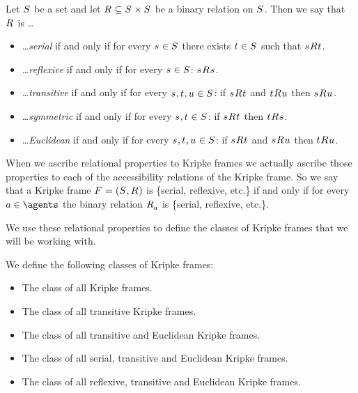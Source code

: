 \pagebreak

\begin{definition}
Let $\kStates$ be a set and let $\kAccessibilityRel \subseteq \kStates \times \kStates$ be a binary relation on $\kStates$. 
Then we say that $\kAccessibilityRel$ is \ldots
\begin{itemize}
    \item \ldots {\em serial} if and only if for every $\kStateS \in \kStates$ there exists $\kStateT \in \kStates$ such that $\kStateS \kAccessibility{} \kStateT$.
    \item \ldots {\em reflexive} if and only if for every $\kStateS \in \kStates$: $\kStateS \kAccessibility{} \kStateS$.
    \item \ldots {\em transitive} if and only if for every $\kStateS, \kStateT, \kStateU \in \kStates$: if $\kStateS \kAccessibility{} \kStateT$ and $\kStateT \kAccessibility{} \kStateU$ then $\kStateS \kAccessibility{} \kStateU$.
    \item \ldots {\em symmetric} if and only if for every $\kStateS, \kStateT \in \kStates$: if $\kStateS \kAccessibility{} \kStateT$ then $\kStateT \kAccessibility{} \kStateS$.
    \item \ldots {\em Euclidean} if and only if for every $\kStateS, \kStateT, \kStateU \in \kStates$: if $\kStateS \kAccessibility{} \kStateT$ and $\kStateS \kAccessibility{} \kStateU$ then $\kStateT \kAccessibility{} \kStateU$.
\end{itemize}
\end{definition}

When we ascribe relational properties to Kripke frames we actually ascribe those properties to each of the accessibility relations of the Kripke frame.
So we say that a Kripke frame $\kFrameAndTuple$ is \{serial, reflexive, etc.\} if and only if for every $\agentA \in \agents$ the binary relation $\kAccessibilityA$ is \{serial, reflexive, etc.\}.

We use these relational properties to define the classes of Kripke frames that we will be working with.

\begin{definition}
We define the following classes of Kripke frames:
\begin{itemize}
    \item The class \classK{} of all Kripke frames.
    \item The class \classKF{} of all transitive Kripke frames.
    \item The class \classKFF{} of all transitive and Euclidean Kripke frames.
    \item The class \classKD{} of all serial, transitive and Euclidean Kripke frames.
    \item The class \classS{} of all reflexive, transitive and Euclidean Kripke frames.
\end{itemize}
\end{definition}

